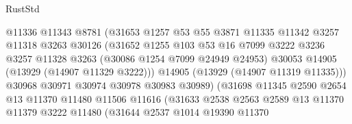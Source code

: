 \begin{lexlean}{RustStd}
\begin{coremodule}
                                  @11336
                                  @11343
                                  @8781
                                  (@31653
                                    @1257
                                    @53
                                    @55
                                    @3871
                                    @11335
                                    @11342
                                    @3257
                                    @11318
                                    @3263
                                    @30126
                                    (@31652
                                      @1255
                                      @103
                                      @53
                                      @16
                                      @7099
                                      @3222
                                      @3236
                                      @3257
                                      @11328
                                      @3263
                                      (@30086 @1254 @7099 @24949 @24953)
                                      @30053
                                      @14905
                                      (@13929 (@14907 @11329 @3222)))
                                    @14905
                                    (@13929 (@14907 @11319 @11335)))
                                  @30968
                                  @30971
                                  @30974
                                  @30978
                                  @30983
                                  @30989)
                                (@31698
                                  @11345
                                  @2590
                                  @2654
                                  @13
                                  @11370
                                  @11480
                                  @11506
                                  @11616
                                  (@31633
                                    @2538
                                    @2563
                                    @2589
                                    @13
                                    @11370
                                    @11379
                                    @3222
                                    @11480
                                    (@31644
                                      @2537
                                      @1014
                                      @19390
                                      @11370

\end{coremodule}
\end{lexlean}
